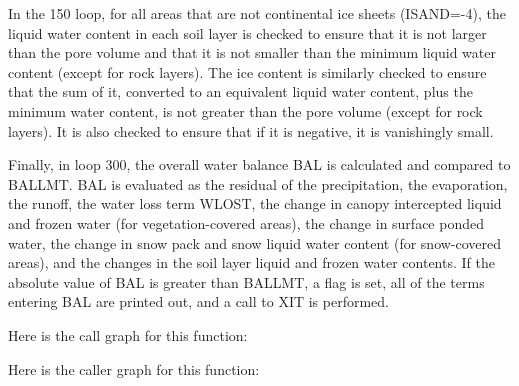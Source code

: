 In the 150 loop, for all areas that are not continental ice sheets (I\+S\+A\+N\+D=-\/4), the liquid water content in each soil layer is checked to ensure that it is not larger than the pore volume and that it is not smaller than the minimum liquid water content (except for rock layers). The ice content is similarly checked to ensure that the sum of it, converted to an equivalent liquid water content, plus the minimum water content, is not greater than the pore volume (except for rock layers). It is also checked to ensure that if it is negative, it is vanishingly small.

Finally, in loop 300, the overall water balance B\+A\+L is calculated and compared to B\+A\+L\+L\+M\+T. B\+A\+L is evaluated as the residual of the precipitation, the evaporation, the runoff, the water loss term W\+L\+O\+S\+T, the change in canopy intercepted liquid and frozen water (for vegetation-\/covered areas), the change in surface ponded water, the change in snow pack and snow liquid water content (for snow-\/covered areas), and the changes in the soil layer liquid and frozen water contents. If the absolute value of B\+A\+L is greater than B\+A\+L\+L\+M\+T, a flag is set, all of the terms entering B\+A\+L are printed out, and a call to X\+I\+T is performed.

Here is the call graph for this function\+:




Here is the caller graph for this function\+:


